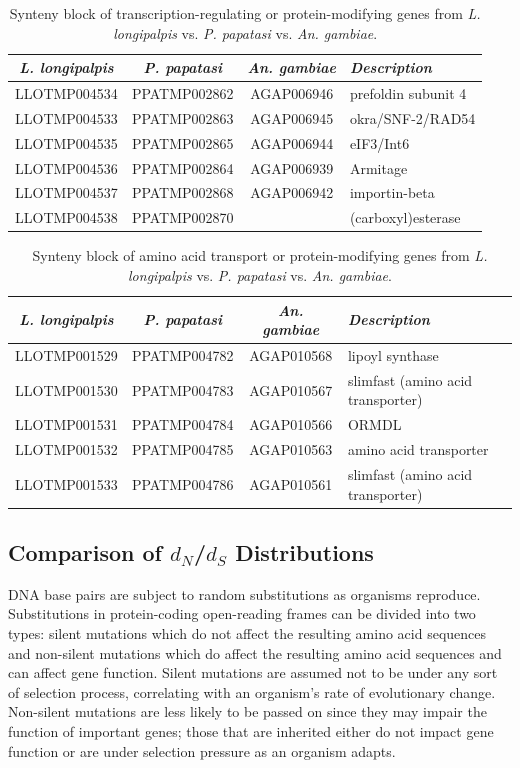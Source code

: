 \begin{table}[H]
  \centering
  \begin{tabular}{c c c l} \hline
    \emph{L. longipalpis} & \emph{P. papatasi} & \emph{An. gambiae} & \emph{Description} \\ \hline
    LLOTMP004534 & PPATMP002862 & AGAP006946 & prefoldin subunit 4 \\
    LLOTMP004533 & PPATMP002863 & AGAP006945 & okra/SNF-2/RAD54 \\
    LLOTMP004535 & PPATMP002865 & AGAP006944 & eIF3/Int6 \\
    LLOTMP004536 & PPATMP002864 & AGAP006939 & Armitage \\
    LLOTMP004537 & PPATMP002868 & AGAP006942 & importin-beta \\
    LLOTMP004538 & PPATMP002870 & & (carboxyl)esterase
    \end{tabular}
    \caption{Synteny block of transcription-regulating or protein-modifying genes from \emph{L. longipalpis} vs. \emph{P. papatasi} vs. \emph{An. gambiae}.}
  \label{tab:synteny-three-way-transcription}
\end{table}

\begin{table}[H]
  \centering
  \begin{tabular}{c c c l} \hline
    \emph{L. longipalpis} & \emph{P. papatasi} & \emph{An. gambiae} & \emph{Description} \\ \hline
    LLOTMP001529 & PPATMP004782 & AGAP010568 & lipoyl synthase \\
    LLOTMP001530 & PPATMP004783 & AGAP010567 & slimfast (amino acid transporter) \\
    LLOTMP001531 & PPATMP004784 & AGAP010566 & ORMDL \\
    LLOTMP001532 & PPATMP004785 & AGAP010563 & amino acid transporter \\
    LLOTMP001533 & PPATMP004786 & AGAP010561 & slimfast (amino acid transporter)
    \end{tabular}
    \caption{Synteny block of amino acid transport or protein-modifying genes from \emph{L. longipalpis} vs. \emph{P. papatasi} vs. \emph{An. gambiae}.}
  \label{tab:synteny-three-way-amino}
\end{table}

\subsection{Comparison of $d_N$/$d_S$ Distributions}
DNA base pairs are subject to random substitutions as organisms reproduce.  Substitutions in protein-coding open-reading frames can be divided into two types: silent mutations which do not affect the resulting amino acid sequences and non-silent mutations which do affect the resulting amino acid sequences and can affect gene function.  Silent mutations are assumed not to be under any sort of selection process, correlating with an organism's rate of evolutionary change.  Non-silent mutations are less likely to be passed on since they may impair the function of important genes; those that are inherited either do not impact gene function or are under selection pressure as an organism adapts.


